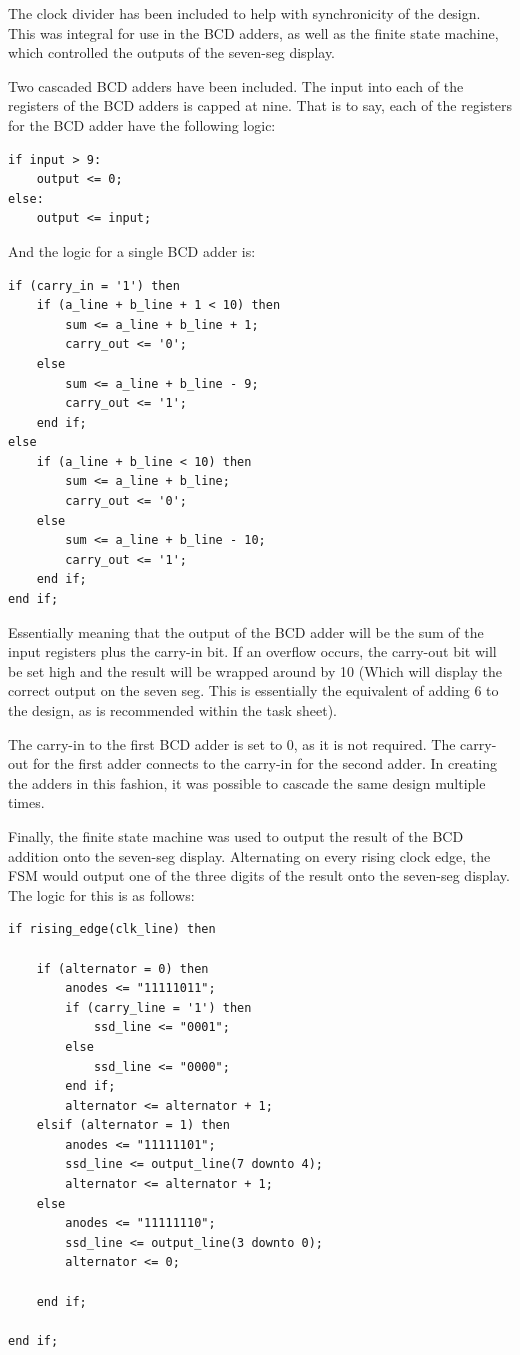 \documentclass[12pt,a4paper]{article}
\begin{document}
The clock divider has been included to help with synchronicity of the design. This was integral for use in the BCD adders, as well as the finite state machine, which controlled the outputs of the seven-seg display. 

Two cascaded BCD adders have been included. The input into each of the registers of the BCD adders is capped at nine. That is to say, each of the registers for the BCD adder have the following logic:

\begin{verbatim}
if input > 9:
    output <= 0;
else:
    output <= input;
\end{verbatim}

And the logic for a single BCD adder is:

\begin{verbatim}
if (carry_in = '1') then
    if (a_line + b_line + 1 < 10) then
        sum <= a_line + b_line + 1;
        carry_out <= '0';
    else
        sum <= a_line + b_line - 9;
        carry_out <= '1';
    end if;
else 
    if (a_line + b_line < 10) then
        sum <= a_line + b_line;
        carry_out <= '0';
    else
        sum <= a_line + b_line - 10;
        carry_out <= '1';
    end if;
end if;
\end{verbatim}

Essentially meaning that the output of the BCD adder will be the sum of the input registers plus the carry-in bit. If an overflow occurs, the carry-out bit will be set high and the result will be wrapped around by 10 (Which will display the correct output on the seven seg. This is essentially the equivalent of adding 6 to the design, as is recommended within the task sheet).

The carry-in to the first BCD adder is set to 0, as it is not required. The carry-out for the first adder connects to the carry-in for the second adder. In creating the adders in this fashion, it was possible to cascade the same design multiple times.

Finally, the finite state machine was used to output the result of the BCD addition onto the seven-seg display. Alternating on every rising clock edge, the FSM would output one of the three digits of the result onto the seven-seg display. The logic for this is as follows:

\begin{verbatim}
if rising_edge(clk_line) then

    if (alternator = 0) then
        anodes <= "11111011";
        if (carry_line = '1') then
            ssd_line <= "0001";
        else 
            ssd_line <= "0000";
        end if;
        alternator <= alternator + 1;
    elsif (alternator = 1) then
        anodes <= "11111101";
        ssd_line <= output_line(7 downto 4);
        alternator <= alternator + 1;
    else
        anodes <= "11111110";
        ssd_line <= output_line(3 downto 0);
        alternator <= 0;
        
    end if;
    
end if;
\end{verbatim}
\end{document}
